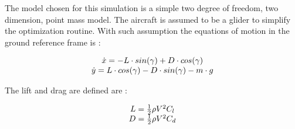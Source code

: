 

\par The model chosen for this simulation is a simple two degree of freedom, two dimension, point mass model. 
The aircraft is assumed to be a glider to simplify the optimization routine. 
With such assumption the equations of motion in the ground reference frame is :

\begin{equation}
	\begin{array}[c]{c}
		\dot{x}= -L \cdot sin(\gamma) + D \cdot cos(\gamma) \\ 
		\dot{y}= L \cdot cos(\gamma) - D \cdot sin(\gamma) - m \cdot g
	\end{array}
	\label{eqn:eqm}
\end{equation}


\par The lift and drag are defined are :

\begin{equation}
	\begin{array}[c]{c}
		L= \frac{1}{2} \rho V^2 C_l \\ 
		D= \frac{1}{2} \rho V^2 C_d
	\end{array}
	\label{eqn:Cl_def}
\end{equation}







